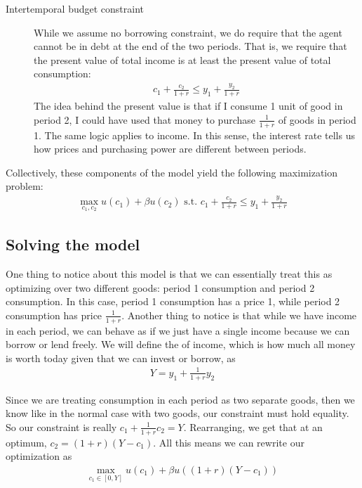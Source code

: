 \begin{description}
    \item[Intertemporal budget constraint] While we assume no borrowing constraint, we do require that the agent cannot be in debt at the end of the two periods. That is, we require that the present value of total income is at least the present value of total consumption:
    \begin{align*}
        c_1 + \frac{c_2}{1 + r} \leq y_1 + \frac{y_2}{1 + r}
    \end{align*}
    The idea behind the present value is that if I consume 1 unit of good in period 2, I could have used that money to purchase $\frac{1}{1 + r}$ of goods in period 1. The same logic applies to income. In this sense, the interest rate tells us how prices and purchasing power are different between periods.  
\end{description}
Collectively, these components of the model yield the following maximization problem:
\begin{align*}
    \max_{c_1, c_2} u(c_1) + \beta u(c_2) \text{ s.t. } c_1 + \frac{c_2}{1 + r} \leq y_1 + \frac{y_2}{1 + r}
\end{align*}

\subsection*{Solving the model}
One thing to notice about this model is that we can essentially treat this as optimizing over two different goods: period 1 consumption and period 2 consumption. In this case, period 1 consumption has a price 1, while period 2 consumption has price $\frac{1}{1 + r}$. Another thing to notice is that while we have income in each period, we can behave as if we just have a single income because we can borrow or lend freely. We will define the  of income, which is how much all money is worth today given that we can invest or borrow, as
\begin{align*}
    Y = y_1 + \frac{1}{1 + r} y_2
\end{align*}

Since we are treating consumption in each period as two separate goods, then we know like in the normal case with two goods, our constraint must hold equality. So our constraint is really $c_1 + \frac{1}{1 + r} c_2 = Y$. Rearranging, we get that at an optimum, $c_2 = (1 + r)(Y - c_1)$. All this means we can rewrite our optimization as
\begin{align*}
    \max_{c_1 \in [0, Y]} u(c_1) + \beta u((1 + r) (Y - c_1))
\end{align*}

